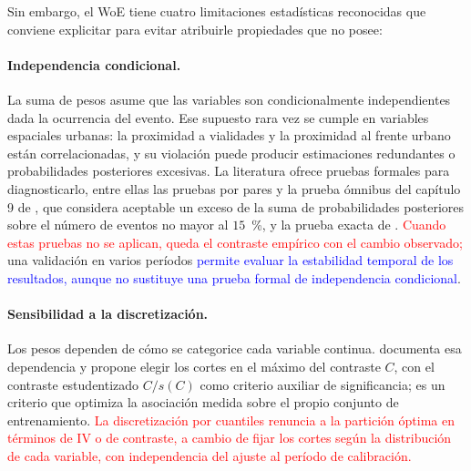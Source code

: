 
Sin embargo, el WoE tiene cuatro limitaciones estadísticas reconocidas que
conviene explicitar para evitar atribuirle propiedades que no posee:

\paragraph{Independencia condicional.} La suma de pesos asume que las variables
son condicionalmente independientes dada la ocurrencia del evento. Ese
supuesto rara vez se cumple en variables espaciales urbanas: la proximidad a
vialidades y la proximidad al frente urbano están correlacionadas, y su
violación puede producir estimaciones redundantes o probabilidades posteriores
excesivas. La literatura ofrece pruebas formales para diagnosticarlo, entre
ellas las pruebas por pares y la prueba ómnibus del capítulo 9 de
\textcite{BonhamCarter1994}, que considera aceptable un exceso de la suma de
probabilidades posteriores sobre el número de eventos no mayor al $15$~\%, y
la prueba exacta de \textcite{AgterbergCheng2002}. \textcolor{red}{Cuando
estas pruebas no se aplican, queda el contraste empírico con el cambio
observado;} una validación en varios períodos
\textcolor{blue}{permite evaluar la estabilidad temporal de los resultados,
aunque no sustituye una prueba formal de independencia condicional}.


\paragraph{Sensibilidad a la discretización.} Los pesos dependen de cómo se
categorice cada variable continua. \textcite{BonhamCarter1994} documenta esa
dependencia y propone elegir los cortes en el máximo del contraste $C$, con el
contraste estudentizado $C/s(C)$ como criterio auxiliar de significancia; es un
criterio que optimiza la asociación medida sobre el propio conjunto de
entrenamiento. \textcolor{red}{La discretización por cuantiles renuncia a la
partición óptima en términos de IV o de contraste, a cambio de fijar los cortes
según la distribución de cada variable, con independencia del ajuste al período
de calibración.}

